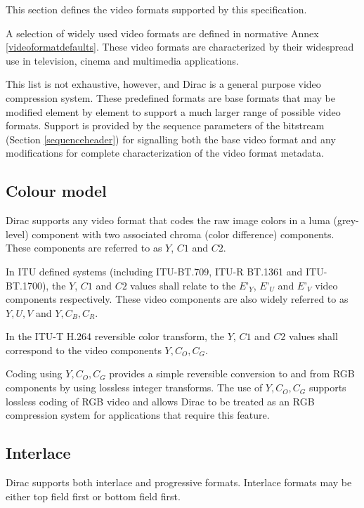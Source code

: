 This section defines the video formats supported by this specification.

A selection of widely used video formats are defined in normative Annex 
\ref{videoformatdefaults}. These video formats are characterized by
their widespread use in television, cinema and multimedia applications.

This list is not exhaustive, however, and Dirac is a general purpose video 
compression system. These predefined formats are base formats that 
may be modified element by
element to support a much larger range of possible video formats. Support
is provided by the sequence parameters of the bitstream (Section 
\ref{sequenceheader}) for signalling both the base video format and
any modifications for complete characterization of the video format metadata.


\subsection{Colour model}

Dirac supports any video format that codes the raw image colors in a luma 
(grey-level) component with two associated chroma (color difference) components.
 These components are referred to as $Y$, $C1$ and $C2$.

In ITU defined systems (including ITU-BT.709, ITU-R BT.1361 and ITU-BT.1700), 
the $Y$, $C1$ and $C2$ values shall relate to the $E’_Y$, $E’_U$ and $E’_V$ 
video components respectively. These video components are also widely referred 
to as $Y, U, V$ and $Y, C_B , C_R$.

In the ITU-T H.264 reversible color transform, the $Y$, $C1$ and $C2$ values 
shall correspond to the video components $Y, C_O, C_G$.

\begin{informative}
Coding using $Y, C_O, C_G$ provides a simple reversible conversion to and from
RGB components by using lossless integer transforms. The use of $Y, C_O, C_G$
supports lossless coding of RGB video and allows Dirac to be treated as an RGB
compression system for applications that require this feature.
\end{informative}

\subsection{Interlace}

Dirac supports both interlace and progressive formats. Interlace formats may be
 either top field first or bottom field first.

